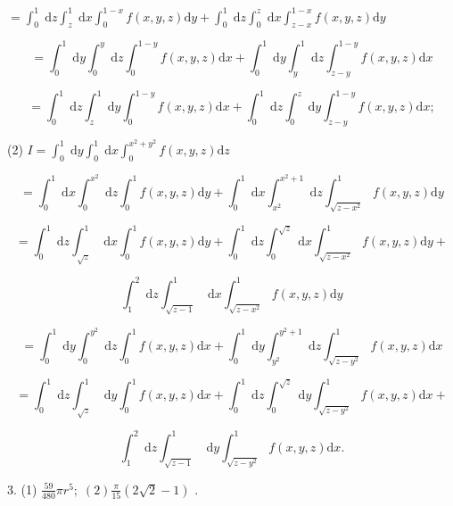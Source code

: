 \(= {\int }_{0}^{1}\mathrm{\;d}z{\int }_{z}^{1}\mathrm{\;d}x{\int }_{0}^{1 - x}f\left( {x,y,z}\right) \mathrm{d}y + {\int }_{0}^{1}\mathrm{\;d}z{\int }_{0}^{z}\mathrm{\;d}x{\int }_{z - x}^{1 - x}f\left( {x,y,z}\right) \mathrm{d}y\)

\[
= {\int }_{0}^{1}\mathrm{\;d}y{\int }_{0}^{y}\mathrm{\;d}z{\int }_{0}^{1 - y}f\left( {x,y,z}\right) \mathrm{d}x + {\int }_{0}^{1}\mathrm{\;d}y{\int }_{y}^{1}\mathrm{\;d}z{\int }_{z - y}^{1 - y}f\left( {x,y,z}\right) \mathrm{d}x
\]

\[
= {\int }_{0}^{1}\mathrm{\;d}z{\int }_{z}^{1}\mathrm{\;d}y{\int }_{0}^{1 - y}f\left( {x,y,z}\right) \mathrm{d}x + {\int }_{0}^{1}\mathrm{\;d}z{\int }_{0}^{z}\mathrm{\;d}y{\int }_{z - y}^{1 - y}f\left( {x,y,z}\right) \mathrm{d}x;
\]

(2) \(I = {\int }_{0}^{1}\mathrm{\;d}y{\int }_{0}^{1}\mathrm{\;d}x{\int }_{0}^{{x}^{2} + {y}^{2}}f\left( {x,y,z}\right) \mathrm{d}z\)

\[
= {\int }_{0}^{1}\mathrm{\;d}x{\int }_{0}^{{x}^{2}}\mathrm{\;d}z{\int }_{0}^{1}f\left( {x,y,z}\right) \mathrm{d}y + {\int }_{0}^{1}\mathrm{\;d}x{\int }_{{x}^{2}}^{{x}^{2} + 1}\mathrm{\;d}z{\int }_{\sqrt{z - {x}^{2}}}^{1}f\left( {x,y,z}\right) \mathrm{d}y
\]

\[
= {\int }_{0}^{1}\mathrm{\;d}z{\int }_{\sqrt{z}}^{1}\mathrm{\;d}x{\int }_{0}^{1}f\left( {x,y,z}\right) \mathrm{d}y + {\int }_{0}^{1}\mathrm{\;d}z{\int }_{0}^{\sqrt{z}}\mathrm{\;d}x{\int }_{\sqrt{z - {x}^{2}}}^{1}f\left( {x,y,z}\right) \mathrm{d}y +
\]

\[
{\int }_{1}^{2}\mathrm{\;d}z{\int }_{\sqrt{z - 1}}^{1}\mathrm{\;d}x{\int }_{\sqrt{z - {x}^{2}}}^{1}f\left( {x,y,z}\right) \mathrm{d}y
\]

\[
= {\int }_{0}^{1}\mathrm{\;d}y{\int }_{0}^{{y}^{2}}\mathrm{\;d}z{\int }_{0}^{1}f\left( {x,y,z}\right) \mathrm{d}x + {\int }_{0}^{1}\mathrm{\;d}y{\int }_{{y}^{2}}^{{y}^{2} + 1}\mathrm{\;d}z{\int }_{\sqrt{z - {y}^{2}}}^{1}f\left( {x,y,z}\right) \mathrm{d}x
\]

\[
= {\int }_{0}^{1}\mathrm{\;d}z{\int }_{\sqrt{z}}^{1}\mathrm{\;d}y{\int }_{0}^{1}f\left( {x,y,z}\right) \mathrm{d}x + {\int }_{0}^{1}\mathrm{\;d}z{\int }_{0}^{\sqrt{z}}\mathrm{\;d}y{\int }_{\sqrt{z - {y}^{2}}}^{1}f\left( {x,y,z}\right) \mathrm{d}x +
\]

\[
{\int }_{1}^{2}\mathrm{\;d}z{\int }_{\sqrt{z - 1}}^{1}\mathrm{\;d}y{\int }_{\sqrt{z - {y}^{2}}}^{1}f\left( {x,y,z}\right) \mathrm{d}x.
\]

3. (1) \(\frac{59}{480}\pi {r}^{5};\;\left( 2\right) \frac{\pi }{15}\left( {2\sqrt{2} - 1}\right)\) .

